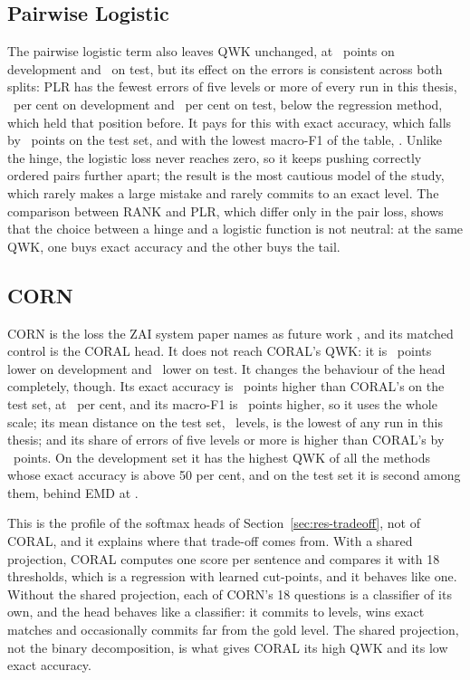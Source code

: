 \subsection{Pairwise Logistic}

The pairwise logistic term also leaves QWK unchanged, at \nlDeltaDevQwkPlr\ points on development
and \nlDeltaTestQwkPlr\ on test, but its effect on the errors is consistent across both splits:
PLR has the fewest errors of five levels or more of every run in this thesis,
\nlDevFarFivePlr\ per cent on development and \nlTestFarFivePlr\ per cent on test, below the
regression method, which held that position before. It pays for this with exact accuracy, which
falls by \nlAbsDeltaTestAccPlr\ points on the test set, and with the lowest macro-F1 of the
table, \nlTestMfPlr. Unlike the hinge, the logistic loss never reaches zero, so it keeps pushing
correctly ordered pairs further apart; the result is the most cautious model of the study, which
rarely makes a large mistake and rarely commits to an exact level. The comparison between RANK
and PLR, which differ only in the pair loss, shows that the choice between a hinge and a logistic
function is not neutral: at the same QWK, one buys exact accuracy and the other buys the tail.

\subsection{CORN}

CORN is the loss the ZAI system paper names as future work \cite{nazzal2025zai}, and its matched
control is the CORAL head. It does not reach CORAL's QWK: it is \nlAbsDeltaDevQwkCorn\ points lower
on development and \nlAbsDeltaTestQwkCorn\ lower on test. It changes the behaviour of the head
completely, though. Its exact accuracy is \nlAbsDeltaTestAccCorn\ points higher than CORAL's on
the test set, at \nlTestAccCorn\ per cent, and its macro-F1 is \nlDeltaTestMfCorn\ points higher,
so it uses the whole scale; its mean distance on the test set, \nlTestDistCorn\ levels, is the
lowest of any run in this thesis; and its share of errors of five levels or more is higher than
CORAL's by \nlDeltaTestFarFiveCorn\ points. On the development set it has the highest QWK of all
the methods whose exact accuracy is above 50 per cent, and on the test set it is second among
them, behind EMD at \testQwkEMD.

This is the profile of the softmax heads of Section~\ref{sec:res-tradeoff}, not of CORAL, and it
explains where that trade-off comes from. With a shared projection, CORAL computes one score per
sentence and compares it with 18 thresholds, which is a regression with learned cut-points, and
it behaves like one. Without the shared projection, each of CORN's 18 questions is a classifier of
its own, and the head behaves like a classifier: it commits to levels, wins exact matches and
occasionally commits far from the gold level. The shared projection, not the binary
decomposition, is what gives CORAL its high QWK and its low exact accuracy.

